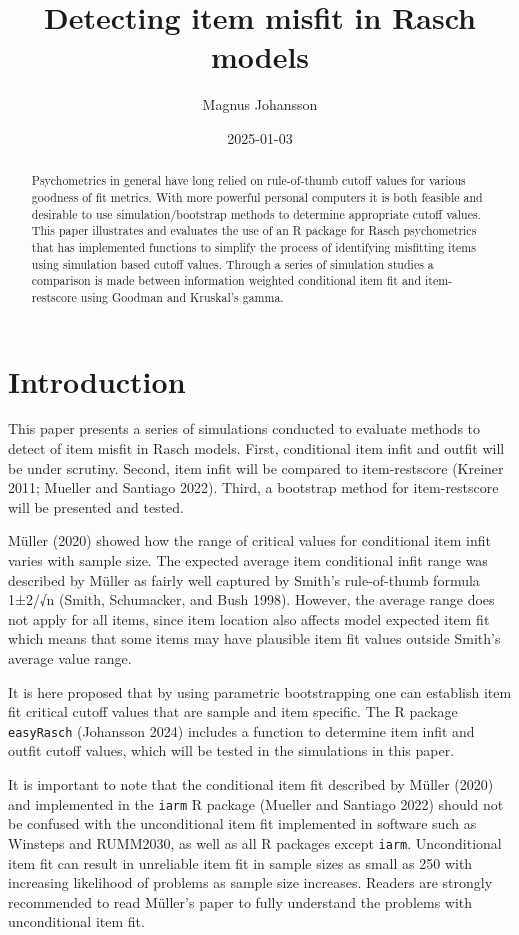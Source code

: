 \documentclass[
  letterpaper,
  DIV=11,
  numbers=noendperiod]{scrartcl}
\title{Detecting item misfit in Rasch models}
\author{Magnus Johansson}
\date{2025-01-03}
\begin{document}
\maketitle
\begin{abstract}
Psychometrics in general have long relied on rule-of-thumb cutoff values
for various goodness of fit metrics. With more powerful personal
computers it is both feasible and desirable to use simulation/bootstrap
methods to determine appropriate cutoff values. This paper illustrates
and evaluates the use of an R package for Rasch psychometrics that has
implemented functions to simplify the process of identifying misfitting
items using simulation based cutoff values. Through a series of
simulation studies a comparison is made between information weighted
conditional item fit and item-restscore using Goodman and Kruskal's
gamma.
\end{abstract}


\section{Introduction}\label{introduction}

This paper presents a series of simulations conducted to evaluate
methods to detect of item misfit in Rasch models. First, conditional
item infit and outfit will be under scrutiny. Second, item infit will be
compared to item-restscore (Kreiner 2011; Mueller and Santiago 2022).
Third, a bootstrap method for item-restscore will be presented and
tested.

Müller (2020) showed how the range of critical values for conditional
item infit varies with sample size. The expected average item
conditional infit range was described by Müller as fairly well captured
by Smith's rule-of-thumb formula 1±2/√n (Smith, Schumacker, and Bush
1998). However, the average range does not apply for all items, since
item location also affects model expected item fit which means that some
items may have plausible item fit values outside Smith's average value
range.

It is here proposed that by using parametric bootstrapping one can
establish item fit critical cutoff values that are sample and item
specific. The R package \texttt{easyRasch} (Johansson 2024) includes a
function to determine item infit and outfit cutoff values, which will be
tested in the simulations in this paper.

It is important to note that the conditional item fit described by
Müller (2020) and implemented in the \texttt{iarm} R package (Mueller
and Santiago 2022) should not be confused with the unconditional item
fit implemented in software such as Winsteps and RUMM2030, as well as
all R packages except \texttt{iarm}. Unconditional item fit can result
in unreliable item fit in sample sizes as small as 250 with increasing
likelihood of problems as sample size increases. Readers are strongly
recommended to read Müller's paper to fully understand the problems with
unconditional item fit.
\end{document}
